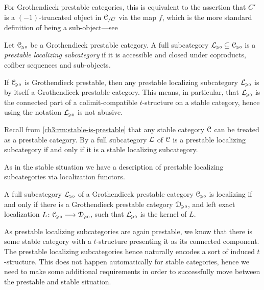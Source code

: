 \begin{remark}
    For Grothendieck prestable categories, this is equivalent to the assertion that $C'$ is a $(-1)$-truncated object in $\EuScript{C}_{/C}$ via the map $f$, which is the more standard definition of being a sub-object---see \cite[C.2.3.4]{lurie_SAG}
\end{remark}

\begin{definition}
    Let $\EuScript{C}_{\hspace{-1pt}\scriptscriptstyle\geqslant 0}$ be a Grothendieck prestable category. A full subcategory $\mathcal{L}_{\hspace{-1pt}\scriptscriptstyle\geqslant 0}\subseteq \EuScript{C}_{\hspace{-1pt}\scriptscriptstyle\geqslant 0}$ is a \emph{prestable localizing subcategory} if it is accessible and closed under coproducts, cofiber sequences and sub-objects. 
\end{definition}

\begin{remark}
    \label{ch3:rm:prestable-localizing-is-Grothendieck}
    If $\EuScript{C}_{\hspace{-1pt}\scriptscriptstyle\geqslant 0}$ is Grothendieck prestable, then any prestable localizing subcategory $\mathcal{L}_{\hspace{-1pt}\scriptscriptstyle\geqslant 0}$ is by \cite[C.5.2.1]{lurie_SAG} itself a Grothendieck prestable category. This means, in particular, that $\mathcal{L}_{\hspace{-1pt}\scriptscriptstyle\geqslant 0}$ is the connected part of a colimit-compatible $t$-structure on a stable category, hence using the notation $\mathcal{L}_{\hspace{-1pt}\scriptscriptstyle\geqslant 0}$ is not abusive. 
\end{remark}

\begin{remark}
    \label{ch3:rm:prestable-localizing-in-stable-then-stable-localizing}
    Recall from \cref{ch3:rm:stable-is-prestable} that any stable category $\EuScript{C}$ can be treated as a prestable category. By \cite[C.2.3.6]{lurie_SAG} a full subcategory $\mathcal{L}$ of $\EuScript{C}$ is a prestable localizing subcategory if and only if it is a stable localizing subcategory. 
\end{remark}

As in the stable situation we have a description of prestable localizing subcategories via localization functors. 

\begin{proposition}
    \label{ch3:prop:Lurie-prestable-localizing-left-exact-functor}
    A full subcategory $\mathcal{L}_{\hspace{-1pt}\scriptscriptstyle\geqslant 0}$ of a Grothendieck prestable category $\EuScript{C}_{\hspace{-1pt}\scriptscriptstyle\geqslant 0}$ is localizing if and only if there is a Grothendieck prestable category $\EuScript{D}_{\hspace{-1pt}\scriptscriptstyle\geqslant 0}$, and left exact localization $L\colon\EuScript{C}_{\hspace{-1pt}\scriptscriptstyle\geqslant 0}\longrightarrow\EuScript{D}_{\hspace{-1pt}\scriptscriptstyle\geqslant 0}$, such that $\mathcal{L}_{\hspace{-1pt}\scriptscriptstyle\geqslant 0}$ is the kernel of $L$. 
\end{proposition}


As prestable localizing subcategories are again prestable, we know that there is some stable category with a $t$-structure presenting it as its connected component. The prestable localizing subcategories hence naturally encodes a sort of induced $t$-structure. This does not happen automatically for stable categories, hence we need to make some additional requirements in order to successfully move between the prestable and stable situation. 

